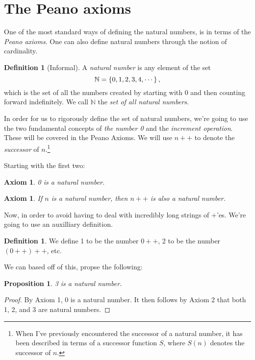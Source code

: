 \documentclass[a4paper, twocolumn]{report}
\newcounter{dummy} \numberwithin{dummy}{section}
\newcounter{axmcntr} \numberwithin{axmcntr}{chapter}
\newtheorem{axm}[axmcntr]{Axiom}
\newtheorem{prp}[dummy]{Proposition}
\theoremstyle{definition}
\newtheorem{defn}[dummy]{Definition}
\theoremstyle{solution}
\newcommand{\dplus}{{+}{+}} %
\begin{document}
\section{The Peano axioms}
One of the most standard ways of defining the natural numbers, is in terms of
the \textit{Peano axioms}. One can also define natural numbers through the
notion of cardinality.

\begin{defn}[Informal]
  \label{defn_211}
  A \textit{natural number} is any element of the set
  \begin{equation}
    \notag
    \mathbb{N} = \left\{ 0, 1, 2, 3, 4, \cdots \right\},
  \end{equation}
  which is the set of all the numbers created by starting with 0 and then
  counting forward indefinitely. We call $\mathbb{N}$ the \textit{set of all
  natural numbers}.
\end{defn}

In order for us to rigorously define the set of natural numbers, we're going to
use the two fundamental concepts of \textit{the number 0} and the
\textit{increment operation}.  These will be covered in the Peano Axioms.  We
will use $n\dplus$ to denote the \textit{successor} of $n$.\footnote{When I've
  previously encountered the successor of a natural number, it has been described
  in terms of a successor function $S$, where $S(n)$ denotes the successor of
$n$.}

Starting with the first two: 
\begin{axm}
  \label{axm_21}
  0 is a natural number.
\end{axm}
\begin{axm}
  \label{axm_22}
  If $n$ is a natural number, then $n\dplus$ is also a natural number.
\end{axm}

Now, in order to avoid having to deal with incredibly long strings of $+$'es.
We're going to use an auxilliary definition.
\addtocounter{dummy}{1}
\begin{defn}
  \label{defn_213}
  We define 1 to be the number $0\dplus$, 2 to be the number $(0\dplus)\dplus$, etc.
\end{defn}
We can based off of this, propse the following:

\begin{prp}
  \label{prp_214}
  3 is a natural number.
\end{prp}
\begin{proof}
  By Axiom 1, 0 is a natural number.
  It then follows by Axiom 2 that both 1, 2, and 3 are natural numbers.
\end{proof}
\end{document}
